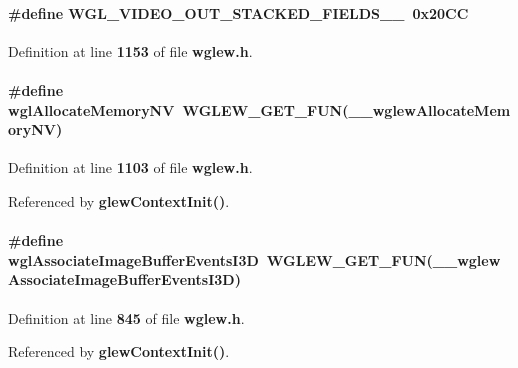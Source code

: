 \paragraph[{W\+G\+L\+\_\+\+V\+I\+D\+E\+O\+\_\+\+O\+U\+T\+\_\+\+S\+T\+A\+C\+K\+E\+D\+\_\+\+F\+I\+E\+L\+D\+S\+\_\+2\+\_\+1}]{\setlength{\rightskip}{0pt plus 5cm}\#define W\+G\+L\+\_\+\+V\+I\+D\+E\+O\+\_\+\+O\+U\+T\+\_\+\+S\+T\+A\+C\+K\+E\+D\+\_\+\+F\+I\+E\+L\+D\+S\+\_\+\_~0x20\+CC}\label{wglew_8h_aef79934314dbff08bc8ec170d902f2f4}


Definition at line {\bf 1153} of file {\bf wglew.\+h}.

\paragraph[{wgl\+Allocate\+Memory\+NV}]{\setlength{\rightskip}{0pt plus 5cm}\#define wgl\+Allocate\+Memory\+NV~{\bf W\+G\+L\+E\+W\+\_\+\+G\+E\+T\+\_\+\+F\+UN}({\bf \+\_\+\+\_\+wglew\+Allocate\+Memory\+NV})}\label{wglew_8h_ad7eff35f844e0081c6b5f105acaea9c1}


Definition at line {\bf 1103} of file {\bf wglew.\+h}.



Referenced by {\bf glew\+Context\+Init()}.

\paragraph[{wgl\+Associate\+Image\+Buffer\+Events\+I3D}]{\setlength{\rightskip}{0pt plus 5cm}\#define wgl\+Associate\+Image\+Buffer\+Events\+I3D~{\bf W\+G\+L\+E\+W\+\_\+\+G\+E\+T\+\_\+\+F\+UN}({\bf \+\_\+\+\_\+wglew\+Associate\+Image\+Buffer\+Events\+I3D})}\label{wglew_8h_aabcf44a9b2ca68604fa56a7125f3a198}


Definition at line {\bf 845} of file {\bf wglew.\+h}.



Referenced by {\bf glew\+Context\+Init()}.

